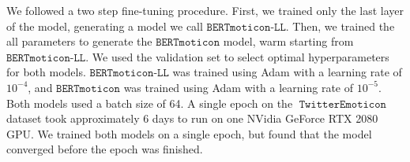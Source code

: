 \documentclass[11pt]{article}
\newcommand{\bertmoji}{\texttt{BERTmoticon}}
\newcommand{\bertmojill}{\texttt{BERTmoticon-LL}}
\DeclareMathOperator{\emoticon}{\texttt{TwitterEmoticon}}
\begin{document}
We followed a two step fine-tuning procedure.
First, we trained only the last layer of the model,
generating a model we call $\bertmojill$.
Then, we trained the all parameters to generate the $\bertmoji$ model,
warm starting from $\bertmojill$.
We used the validation set to select optimal hyperparameters for both models.
$\bertmojill$ was trained using Adam \citep{kingma2014adam} with a learning rate of $10^{-4}$,
and $\bertmoji$ was trained using Adam with a learning rate of $10^{-5}$.
Both models used a batch size of 64.
A single epoch on the $\emoticon$ dataset took approximately 6 days to run on one NVidia GeForce RTX 2080 GPU.
We trained both models on a single epoch, but found that the model converged before the epoch was finished.
%

\end{document}
